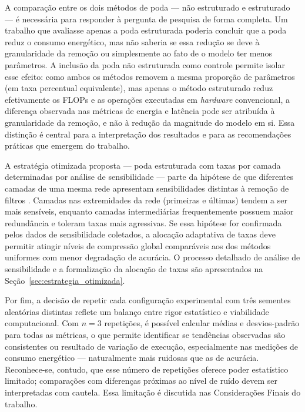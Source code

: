 A comparação entre os dois métodos de poda --- não estruturado e estruturado --- é necessária para responder à pergunta de pesquisa de forma completa. Um trabalho que avaliasse apenas a poda estruturada poderia concluir que a poda reduz o consumo energético, mas não saberia se essa redução se deve à granularidade da remoção ou simplesmente ao fato de o modelo ter menos parâmetros. A inclusão da poda não estruturada como controle permite isolar esse efeito: como ambos os métodos removem a mesma proporção de parâmetros (em taxa percentual equivalente), mas apenas o método estruturado reduz efetivamente os FLOPs e as operações executadas em \textit{hardware} convencional, a diferença observada nas métricas de energia e latência pode ser atribuída à granularidade da remoção, e não à redução da magnitude do modelo em si. Essa distinção é central para a interpretação dos resultados e para as recomendações práticas que emergem do trabalho.

A estratégia otimizada proposta --- poda estruturada com taxas por camada determinadas por análise de sensibilidade --- parte da hipótese de que diferentes camadas de uma mesma rede apresentam sensibilidades distintas à remoção de filtros \cite{Han2015, Yang2017}. Camadas nas extremidades da rede (primeiras e últimas) tendem a ser mais sensíveis, enquanto camadas intermediárias frequentemente possuem maior redundância e toleram taxas mais agressivas. Se essa hipótese for confirmada pelos dados de sensibilidade coletados, a alocação adaptativa de taxas deve permitir atingir níveis de compressão global comparáveis aos dos métodos uniformes com menor degradação de acurácia. O processo detalhado de análise de sensibilidade e a formalização da alocação de taxas são apresentados na Seção~\ref{sec:estrategia_otimizada}.

Por fim, a decisão de repetir cada configuração experimental com três sementes aleatórias distintas reflete um balanço entre rigor estatístico e viabilidade computacional. Com $n = 3$ repetições, é possível calcular médias e desvios-padrão para todas as métricas, o que permite identificar se tendências observadas são consistentes ou resultado de variação de execução, especialmente nas medições de consumo energético --- naturalmente mais ruidosas que as de acurácia. Reconhece-se, contudo, que esse número de repetições oferece poder estatístico limitado; comparações com diferenças próximas ao nível de ruído devem ser interpretadas com cautela. Essa limitação é discutida nas Considerações Finais do trabalho.


